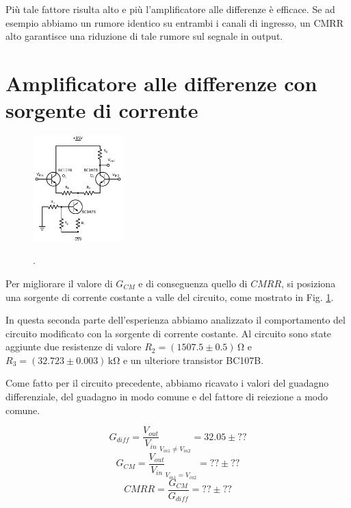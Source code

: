 Più tale fattore risulta alto e più l'amplificatore alle differenze è efficace. Se ad esempio abbiamo un rumore identico su entrambi i canali di ingresso, un CMRR alto garantisce una riduzione di tale rumore sul segnale in output.

\section{Amplificatore alle differenze con sorgente di corrente}
\begin{figure}
	\caption{.}
	\includegraphics[width=35mm]{cc2.pdf}
	\label{fig:cc2}
\end{figure}


Per migliorare il valore di $G_{CM}$ e di conseguenza quello di $CMRR$, si posiziona una sorgente di corrente costante a valle del circuito, come mostrato in Fig. \ref{fig:cc2}.

In questa seconda parte dell'esperienza abbiamo analizzato il comportamento del circuito modificato con la sorgente di corrente costante.
Al circuito sono state aggiunte due resistenze di valore $R_2 = (1507.5 \pm 0.5)\,\si{\ohm}$ e $R_3 = (32.723 \pm 0.003)\,\si{\kilo\ohm}$ e un ulteriore transistor BC107B.

Come fatto per il circuito precedente, abbiamo ricavato i valori del guadagno differenziale, del guadagno in modo comune e del fattore di reiezione a modo comune.

\begin{equation}
	G_{diff} = \frac{V_{out}}{V_{in}} _{V_{in1} \neq V_{in2}} = 32.05 \pm ??
\end{equation}
\begin{equation}
	G_{CM} = \frac{V_{out}}{V_{in}} _{V_{in1} = V_{in2}} = ?? \pm ??
\end{equation}
\begin{equation}
	CMRR = \frac{G_{CM}}{G_{diff}} = ?? \pm ??
\end{equation}